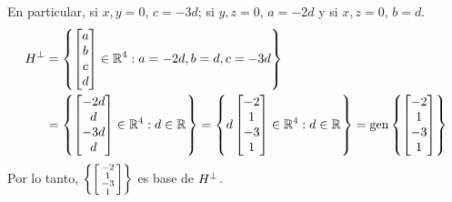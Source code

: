 \begin{solution}
	En particular, si $x, y = 0$, $c = -3d$; si $y, z = 0$, $a = -2d$ y si $x, z = 0$, $b = d$.
	\begin{align*}
		\mperp{H} &=\set{
		\begin{bmatrix}
			a \\ b \\ c \\ d
		\end{bmatrix}
		\in\rmath[4]: a = -2d, b = d, c = -3d
		}\\
		&=\set{
		\begin{bmatrix}
			-2d \\ d \\ -3d \\ d
		\end{bmatrix}
		\in\rmath[4]: d\in\rmath
		} =\set{
		d
		\begin{bmatrix}
			-2 \\ 1 \\ -3 \\ 1
		\end{bmatrix}
		\in\rmath[4]: d\in\rmath
		} =\mgen[1]{\set{
		\begin{bmatrix}
			-2 \\ 1 \\ -3 \\ 1
		\end{bmatrix}
		}}
	\end{align*}
	Por lo tanto, $\left\{ 
	\begin{bsmallmatrix}
		-2 \\ 1 \\ -3 \\ 1
	\end{bsmallmatrix}
	 \right\}$ es base de $\mperp{H}$.
\end{solution}